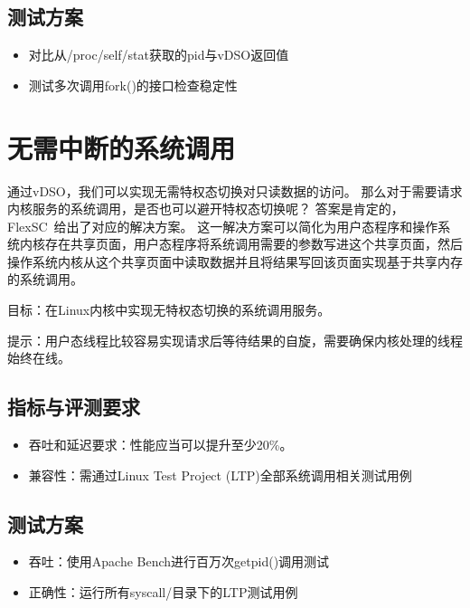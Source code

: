 \subsection*{测试方案}
\begin{itemize}
    \item 对比从/proc/self/stat获取的pid与vDSO返回值
    \item 测试多次调用fork()的接口检查稳定性
\end{itemize}

\section{无需中断的系统调用}
通过vDSO，我们可以实现无需特权态切换对只读数据的访问。
那么对于需要请求内核服务的系统调用，是否也可以避开特权态切换呢？
答案是肯定的，FlexSC~\cite{soares2010flexsc}给出了对应的解决方案。
这一解决方案可以简化为用户态程序和操作系统内核存在共享页面，用户态程序将系统调用需要的参数写进这个共享页面，然后操作系统内核从这个共享页面中读取数据并且将结果写回该页面实现基于共享内存的系统调用。

目标：在Linux内核中实现无特权态切换的系统调用服务。

提示：用户态线程比较容易实现请求后等待结果的自旋，需要确保内核处理的线程始终在线。

\subsection*{指标与评测要求}
\begin{itemize}
    \item 吞吐和延迟要求：性能应当可以提升至少20\%。
    \item 兼容性：需通过Linux Test Project (LTP)全部系统调用相关测试用例
\end{itemize}


\subsection*{测试方案}
\begin{itemize}
    \item 吞吐：使用Apache Bench进行百万次getpid()调用测试
    \item 正确性：运行所有syscall/目录下的LTP测试用例
\end{itemize}